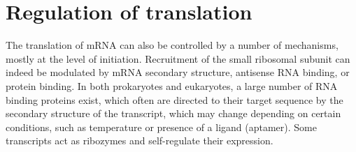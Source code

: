 \hypertarget{regulation-of-translation}{%
\section{Regulation of translation}\label{regulation-of-translation}}

The translation of mRNA can also be controlled by a number of mechanisms, mostly at the level of initiation. Recruitment of the small ribosomal subunit can indeed be modulated by mRNA secondary structure, antisense RNA binding, or protein binding. In both prokaryotes and eukaryotes, a large number of RNA binding proteins exist, which often are directed to their target sequence by the secondary structure of the transcript, which may change depending on certain conditions, such as temperature or presence of a ligand (aptamer). Some transcripts act as ribozymes and self-regulate their expression.


